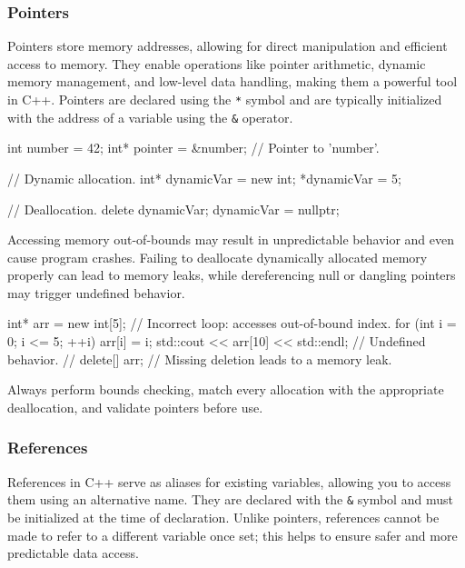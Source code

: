 \subsubsection{Pointers}

Pointers store memory addresses, allowing for direct manipulation and efficient access to memory. They enable operations like pointer arithmetic, dynamic memory management, and low-level data handling, making them a powerful tool in C++. Pointers are declared using the \texttt{*} symbol and are typically initialized with the address of a variable using the \texttt{\&} operator.

\begin{codeblock}[language=C++]
int number = 42;
int* pointer = &number; // Pointer to 'number'.

// Dynamic allocation.
int* dynamicVar = new int;
*dynamicVar = 5;

// Deallocation.
delete dynamicVar;
dynamicVar = nullptr;
\end{codeblock}

\begin{warningblock}

    Accessing memory out-of-bounds may result in unpredictable behavior and even cause program crashes. Failing to deallocate dynamically allocated memory properly can lead to memory leaks, while dereferencing null or dangling pointers may trigger undefined behavior.

    \begin{codeblock}[language=C++]
    int* arr = new int[5];
    // Incorrect loop: accesses out-of-bound index.
    for (int i = 0; i <= 5; ++i) {
        arr[i] = i;
    }
    std::cout << arr[10] << std::endl;  // Undefined behavior.
    // delete[] arr;  // Missing deletion leads to a memory leak.
\end{codeblock}

    Always perform bounds checking, match every allocation with the appropriate deallocation, and validate pointers before use.

\end{warningblock}

\subsubsection{References}

References in C++ serve as aliases for existing variables, allowing you to access them using an alternative name. They are declared with the \texttt{\&} symbol and must be initialized at the time of declaration. Unlike pointers, references cannot be made to refer to a different variable once set; this helps to ensure safer and more predictable data access.

